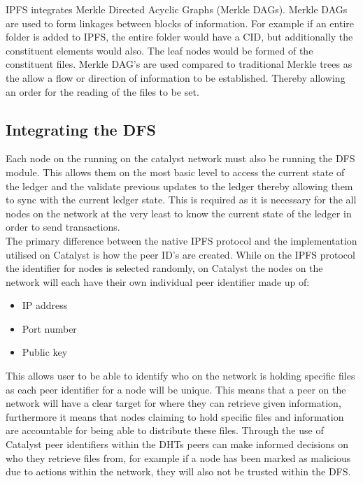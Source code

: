 \documentclass{article}
\begin{document}
IPFS integrates Merkle Directed Acyclic Graphs (Merkle DAGs). Merkle DAGs are used to form linkages between blocks of information. For example if an entire folder is added to IPFS, the entire folder would have a CID, but additionally the constituent elements would also. The leaf nodes would be formed of the constituent files. Merkle DAG's are used compared to traditional Merkle trees as the allow a flow or direction of information to be established. Thereby allowing an order for the reading of the files to be set. 


\subsection{Integrating the DFS}

Each node on the running on the catalyst network must also be running the DFS module. This allows them on the most basic level to access the current state of the ledger and the validate previous updates to the ledger thereby allowing them to sync with the current ledger state. This is required as it is necessary for the all nodes on the network at the very least to know the current state of the ledger in order to send transactions. \\

The primary difference between the native IPFS protocol and the implementation utilised on Catalyst is how the peer ID's are created.  While on the IPFS protocol the identifier for nodes is selected randomly, on Catalyst the nodes on the network will each have their own individual peer identifier\cite{BytesExtentions} made up of:

\begin{itemize}
\item IP address
\item Port number
\item Public key
\end{itemize}

This allows user to be able to identify who on the network is holding specific files as each peer identifier for a node will be unique. This means that a peer on the network will have a clear target for where they can retrieve given information, furthermore it means that nodes claiming to hold specific files and information are accountable for being able to distribute these files. Through the use of Catalyst peer identifiers within the DHTs peers can make informed decisions on who they retrieve files from, for example if a node has been marked as malicious due to actions within the network, they will also not be trusted within the DFS.
\end{document}
